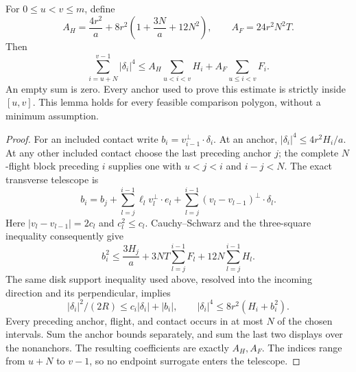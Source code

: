 \begin{lemma}
\label{lem:bl-interior}
For $0\le u<v\le m$, define
\begin{equation}\label{eq:bl-local-constants}
 A_H=\frac{4r^2}{a}
       +8r^2\left(1+\frac{3N}{a}+12N^2\right),
 \qquad A_F=24r^2N^2T.
\end{equation}
Then
\begin{equation}\label{eq:bl-local-coercivity}
 \sum_{i=u+N}^{v-1}|\delta_i|^4
 \le A_H\sum_{u<i<v}H_i+A_F\sum_{u\le i<v}F_i.
\end{equation}
An empty sum is zero.  Every anchor used to prove this estimate
is strictly inside $[u,v]$.  This lemma holds for every feasible
comparison polygon, without a minimum assumption.
\end{lemma}
\begin{proof}
For an included contact write
$b_i=v_{i-1}^{\perp}\cdot\delta_i$.  At an anchor,
$|\delta_i|^4\le4r^2H_i/a$.
At any other included contact choose the last preceding anchor
$j$; the complete $N$-flight block preceding $i$ supplies one
with $u<j<i$ and $i-j<N$.  The exact transverse telescope is
\[
 b_i=b_j+\sum_{l=j}^{i-1}\ell_l v_l^\perp\cdot e_l
          +\sum_{l=j}^{i-1}(v_l-v_{l-1})^\perp\cdot\delta_l.
\]
Here $|v_l-v_{l-1}|=2c_l$ and $c_l^2\le c_l$.  Cauchy--Schwarz
and the three-square inequality consequently give
\[
 b_i^2\le\frac{3H_j}{a}
             +3NT\sum_{l=j}^{i-1}F_l
             +12N\sum_{l=j}^{i-1}H_l.
\]
The same disk support inequality used above, resolved into the
incoming direction and its perpendicular, implies
\[
 |\delta_i|^2/(2R)\le c_i|\delta_i|+|b_i|,
 \qquad |\delta_i|^4\le8r^2(H_i+b_i^2).
\]
Every preceding anchor, flight, and contact occurs in at most $N$
of the chosen intervals.  Sum the anchor bounds separately, and
sum the last two displays over the nonanchors.  The resulting
coefficients are exactly $A_H,A_F$.  The indices range from
$u+N$ to $v-1$, so no endpoint surrogate enters the telescope.
\end{proof}

